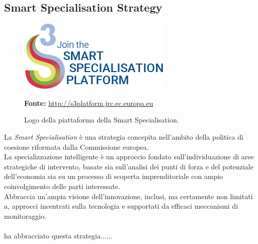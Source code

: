 \subsection{Smart Specialisation Strategy}
\begin{figure}[H]
	\begin{center}
	\includegraphics[scale=0.4]{immagini/join-s3p.png}
	\caption{Logo della piattaforma della Smart Specialisation.}
	\small{\textbf{Fonte:} \url{http://s3platform.jrc.ec.europa.eu}}
	\end{center}
\end{figure}

La \textit{Smart Specialisation} è una strategia concepita nell'ambito della politica di coesione riformata dalla Commissione europea.\\
La specializzazione intelligente è un approccio fondato sull'individuazione di aree strategiche di intervento, basate sia sull'analisi dei punti di forza e del potenziale dell'economia sia su un processo di scoperta imprenditoriale con ampio coinvolgimento delle parti interessate.\\
Abbraccia un'ampia visione dell'innovazione, inclusi, ma certamente non limitati a, approcci incentrati sulla tecnologia e supportati da efficaci meccanismi di monitoraggio.\\
\\
\lab{} ha abbracciato questa strategia......
